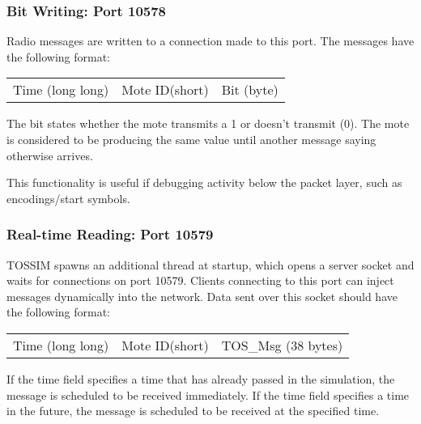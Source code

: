 \documentclass[12pt]{article}
\begin{document}
\subsubsection*{Bit Writing: Port 10578}

Radio messages are written to a connection made to this port. The
messages have the following format:

\vspace{0.1in}
\begin{tabular}{|c|c|c|}\hline
\hspace{4in} & \hspace{1in} & \hspace{0.5in} \\ \hline
Time (long long)& Mote ID(short) & Bit (byte) \\ \hline
\end{tabular}
\vspace{0.1in}

The bit states whether the mote transmits a 1 or doesn't transmit
(0). The mote is considered to be producing the same value until
another message saying otherwise arrives.

This functionality is useful if debugging activity below the packet
layer, such as encodings/start symbols.

\subsubsection*{Real-time Reading: Port 10579}

TOSSIM spawns an additional thread at startup, which opens a server
socket and waits for connections on port 10579. Clients connecting to
this port can inject messages dynamically into the network. Data sent
over this socket should have the following format:

\vspace{0.1in}
\begin{tabular}{|c|c|c|}\hline
\hspace{2in} & \hspace{2in} & \hspace{0.5in} \\ \hline
Time (long long)& Mote ID(short) & TOS\_Msg (38 bytes) \\ \hline
\end{tabular}
\vspace{0.1in}

If the time field specifies a time that has already passed in the
simulation, the message is scheduled to be received immediately. If
the time field specifies a time in the future, the message is
scheduled to be received at the specified time.
\end{document}
